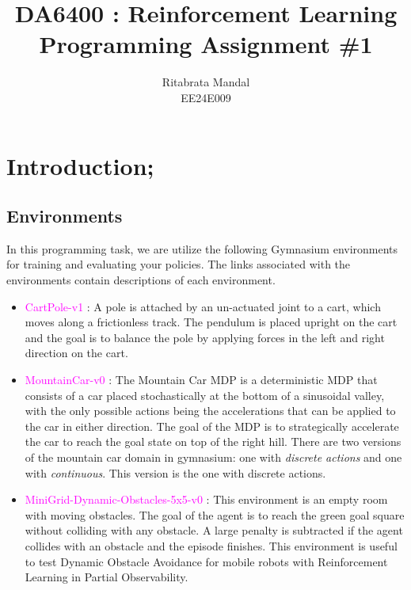 \documentclass[11pt, a4]{article}
\begin{document}
	\author{Ritabrata Mandal\\ EE24E009}
	\title{DA6400 : Reinforcement Learning\\ Programming Assignment \#1}
	\maketitle
	
	\medskip
	
	\newpage
	\section{Introduction;}
		\subsection{Environments}
		In this programming task, we are utilize the following Gymnasium environments for training
		and evaluating your policies. The links associated with the environments contain descriptions
		of each environment.
		\begin{itemize}
			\item \textcolor{magenta}{CartPole-v1} : A pole is attached by an un-actuated joint to a cart, which moves along	a frictionless track. The pendulum is placed upright on the cart and the goal is to
			balance the pole by applying forces in the left and right direction on the cart.
			\item \textcolor{magenta}{MountainCar-v0} : The Mountain Car MDP is a deterministic MDP that consists of a
			car placed stochastically at the bottom of a sinusoidal valley, with the only possible
			actions being the accelerations that can be applied to the car in either direction. The
			goal of the MDP is to strategically accelerate the car to reach the goal state on top of
			the right hill. There are two versions of the mountain car domain in gymnasium: one
			with \textit{discrete actions} and one with \textit{continuous}. This version is the one with discrete
			actions.
			\item \textcolor{magenta}{MiniGrid-Dynamic-Obstacles-5x5-v0} : This environment is an empty
			room with moving obstacles. The goal of the agent is to reach the green goal square
			without colliding with any obstacle. A large penalty is subtracted if the agent collides
			with an obstacle and the episode finishes. This environment is useful to test Dynamic
			Obstacle Avoidance for mobile robots with Reinforcement Learning in Partial Observability.
		\end{itemize}
\end{document}
